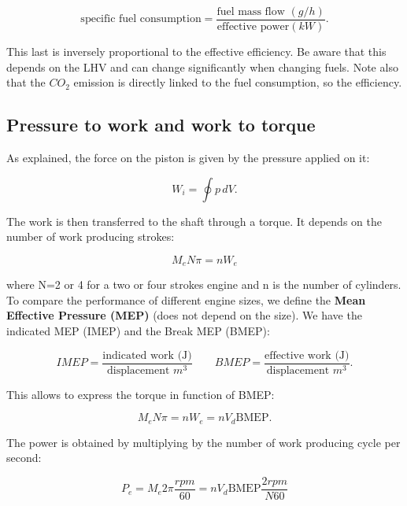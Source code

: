 	\begin{equation}
	\mbox{specific fuel consumption} = \frac{\mbox{fuel mass flow }(g/h)}{\mbox{effective power} (kW)}.
	\end{equation}
	
	This last is inversely proportional to the effective efficiency. Be aware that this depends on the LHV and can change significantly when changing fuels. Note also that the $CO_2$ emission is directly linked to the fuel consumption, so the efficiency. 
	
\subsection{Pressure to work and work to torque}
	As explained, the force on the piston is given by the pressure applied on it:
	
	\begin{equation}
	W_i = \oint p \, dV.
	\end{equation}
	
	The work is then transferred to the shaft through a torque. It depends on the number of work producing strokes:
	
	\begin{equation}
	M_e N\pi = nW_e
\end{equation}	 

	where N=2 or 4 for a two or four strokes engine and n is the number of cylinders. To compare the performance of different engine sizes, we define the \textbf{Mean Effective Pressure (MEP)} (does not depend on the size). We have the indicated MEP (IMEP) and the Break MEP (BMEP):
	
	\begin{equation}
	IMEP = \frac{\mbox{indicated work (J)}}{\mbox{displacement }m^3} \qquad BMEP = \frac{\mbox{effective work (J)}}{\mbox{displacement }m^3}.
 	\end{equation}	 
	
	This allows to express the torque in function of BMEP:
	
	\begin{equation}
	M_e N\pi = nW_e = nV_d \mbox{BMEP}. 
	\end{equation}
	
	The power is obtained by multiplying by the number of work producing cycle per second:
	
	\begin{equation}
	P_e = M_e 2\pi\frac{rpm}{60} = nV_d \mbox{BMEP} \frac{2rpm}{N60}
	\end{equation}\\
	
